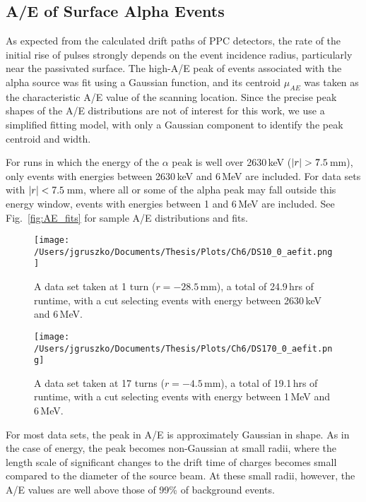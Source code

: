 \subsection{A/E of Surface Alpha Events}
As expected from the calculated drift paths of PPC detectors, the rate of the initial rise of pulses strongly depends on the event incidence radius, particularly near the passivated surface. The high-A/E peak of events associated with the alpha source was fit using a Gaussian function, and its centroid $\mu_{AE}$ was taken as the characteristic A/E value of the scanning location. Since the precise peak shapes of the A/E distributions are not of interest for this work, we use a simplified fitting model, with only a Gaussian component to identify the peak centroid and width. 

For runs in which the energy of the $\alpha$ peak is well over 2630\,keV ($\abs{r} > 7.5$\,mm), only events with energies between 2630\,keV and 6\,MeV are included. For data sets with $\abs{r} < 7.5$\,mm, where all or some of the alpha peak may fall outside this energy window, events with energies between 1 and 6\,MeV are included. See Fig.~\ref{fig:AE_fits} for sample A/E distributions and fits. 

\begin{figure*}[]
 \centering
 \begin{subfigure}[t]{.45\textwidth}
 \texttt{[image: /Users/jgruszko/Documents/Thesis/Plots/Ch6/DS10\_0\_aefit.png]}
 \caption{A data set taken at 1 turn ($r=-28.5$\,mm), a total of 24.9\,hrs of runtime, with a cut selecting events with energy between 2630\,keV and 6\,MeV.}
\end{subfigure}
\hfill
 \begin{subfigure}[t]{.45\textwidth}
 \texttt{[image: /Users/jgruszko/Documents/Thesis/Plots/Ch6/DS170\_0\_aefit.png]}
  \caption{A data set taken at 17 turns ($r=-4.5$\,mm), a total of 19.1\,hrs of runtime, with a cut selecting events with energy between 1\,MeV and 6\,MeV.} 
\end{subfigure}
\caption[Sample A/E distributions and Gaussian peak fits to alpha events]{Sample A/E distributions and Gaussian peak fits to alpha events.}
 \label{fig:AE_fits}
\end{figure*}

For most data sets, the peak in A/E is approximately Gaussian in shape. As in the case of energy, the peak becomes non-Gaussian at small radii, where the length scale of significant changes to the drift time of charges becomes small compared to the diameter of the source beam. At these small radii, however, the A/E values are well above those of 99\% of background events. 

